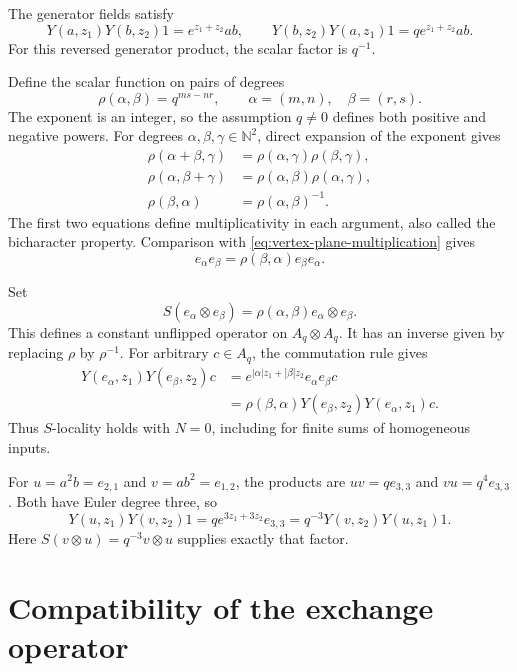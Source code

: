 The generator fields satisfy
\[
 Y(a,z_1)Y(b,z_2)1=e^{z_1+z_2}ab,
 \qquad
 Y(b,z_2)Y(a,z_1)1=q e^{z_1+z_2}ab.
\]
For this reversed generator product, the scalar factor is $q^{-1}$.

Define the scalar function on pairs of degrees
\[
 \rho(\alpha,\beta)=q^{ms-nr},
 \qquad \alpha=(m,n),\quad\beta=(r,s).
\]
The exponent is an integer, so the assumption $q\ne0$ defines
both positive and negative powers.
For degrees $\alpha,\beta,\gamma\in\mathbb N^2$, direct expansion
of the exponent gives
\begin{equation}\label{eq:vertex-bicharacter}
 \begin{aligned}
 \rho(\alpha+\beta,\gamma)
    &=\rho(\alpha,\gamma)\rho(\beta,\gamma),\\
 \rho(\alpha,\beta+\gamma)
    &=\rho(\alpha,\beta)\rho(\alpha,\gamma),\\
 \rho(\beta,\alpha)&=\rho(\alpha,\beta)^{-1}.
 \end{aligned}
\end{equation}
The first two equations define multiplicativity in each argument,
also called the bicharacter property.
Comparison with \eqref{eq:vertex-plane-multiplication} gives
\[
 e_\alpha e_\beta
   =\rho(\beta,\alpha)e_\beta e_\alpha.
\]

Set
\begin{equation}\label{eq:vertex-plane-s}
 S(e_\alpha\otimes e_\beta)
   =\rho(\alpha,\beta)e_\alpha\otimes e_\beta.
\end{equation}
This defines a constant unflipped operator on $A_q\otimes A_q$.
It has an inverse given by replacing $\rho$ by $\rho^{-1}$.
For arbitrary $c\in A_q$, the commutation rule gives
\[
 \begin{aligned}
 Y(e_\alpha,z_1)Y(e_\beta,z_2)c
   &=e^{|\alpha|z_1+|\beta|z_2}e_\alpha e_\beta c\\
   &=\rho(\beta,\alpha)
       Y(e_\beta,z_2)Y(e_\alpha,z_1)c.
 \end{aligned}
\]
Thus $S$-locality holds with $N=0$, including for finite sums
of homogeneous inputs.

For $u=a^2b=e_{2,1}$ and $v=ab^2=e_{1,2}$, the products
are $uv=q e_{3,3}$ and $vu=q^4e_{3,3}$.
Both have Euler degree three, so
\[
 Y(u,z_1)Y(v,z_2)1=q e^{3z_1+3z_2}e_{3,3}
   =q^{-3}Y(v,z_2)Y(u,z_1)1.
\]
Here $S(v\otimes u)=q^{-3}v\otimes u$ supplies exactly that factor.

\section{Compatibility of the exchange operator}
\label{sec:vertex-exchange-axioms}

